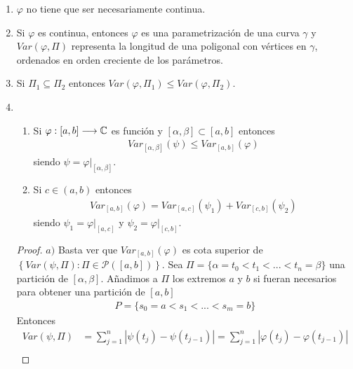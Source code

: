 \begin{obs}
    \begin{enumerate}
        \item $\varphi$ no tiene que ser necesariamente continua.
        \item Si $\varphi$ es continua, entonces $\varphi$ es una parametrización de una curva $\gamma$ y $Var(\varphi,\Pi)$ representa la longitud de una poligonal con vértices en $\gamma$, ordenados en orden creciente de los parámetros.
        \item Si $\Pi_1 \subseteq \Pi_2$ entonces $Var(\varphi,\Pi_1) \leq Var(\varphi,\Pi_2)$.
        \item
              \begin{enumerate}
                  \item Si $\varphi : [a,b] \longrightarrow \mathbb{C}$ es función y $[\alpha,\beta] \subset [a,b]$ entonces
                        \begin{align*}
                            Var_{[\alpha,\beta]}(\psi) \leq Var_{[a,b]}(\varphi)
                        \end{align*}
                        siendo $\psi = \varphi |_{[\alpha,\beta]}$.
                  \item Si $c \in (a,b)$ entonces
                        \begin{align*}
                            Var_{[a,b]}(\varphi) = Var_{[a,c]}(\psi_1) + Var_{[c,b]}(\psi_2)
                        \end{align*}
                        siendo $\psi_1 = \varphi |_{[a,c]}$ y $\psi_2 = \varphi |_{[c,b]}$.
              \end{enumerate}
              \begin{proof}
                  $a)$ Basta ver que $Var_{[a,b]}(\varphi)$ es cota superior de $\left\{ Var(\psi,\Pi) : \Pi \in \mathcal{P}([a,b]) \right\}$. Sea $\Pi = \{ \alpha = t_0 < t_1 < ... < t_n = \beta\}$ una partición de $[\alpha,\beta]$. Añadimos a $\Pi$ los extremos $a$ y $b$ si fueran necesarios para obtener una partición de $[a,b]$
                  \begin{align*}
                      P = \{s_0 = a < s_1 < ... < s_m = b\}
                  \end{align*}
                  Entonces
                  \begin{align*}
                      Var(\psi,\Pi) & = \sum_{j=1}^{n}{|\psi(t_j) - \psi(t_{j-1})|} = \sum_{j=1}^{n}{|\varphi(t_j) - \varphi(t_{j-1})|}  \\

\end{align*}
\end{proof}
\end{enumerate}
\end{obs}
